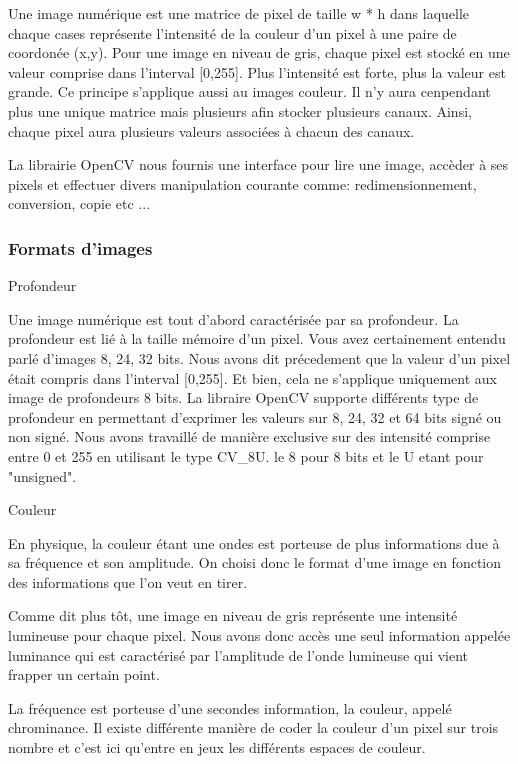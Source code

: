 \documentclass[11pt,a4paper,oldfontcommands]{memoir}
\begin{document}
Une image numérique est une matrice de pixel de taille w * h dans laquelle chaque cases représente l'intensité de la couleur d'un pixel à une paire de coordonée (x,y). Pour une image en niveau de gris, chaque pixel est stocké en une valeur comprise dans l'interval [0,255]. Plus l'intensité est forte, plus la valeur est grande. Ce principe s'applique aussi au images couleur. Il n'y aura cenpendant plus une unique matrice mais plusieurs afin stocker plusieurs canaux. Ainsi, chaque pixel aura plusieurs valeurs associées à chacun des canaux.

La librairie OpenCV nous fournis une interface pour lire une image, accèder à ses pixels et effectuer divers manipulation courante comme: redimensionnement, conversion, copie etc ...


\subsubsection{Formats d'images}

Profondeur

Une image numérique est tout d'abord caractérisée par sa profondeur. La profondeur est lié à la taille mémoire d'un pixel. Vous avez certainement entendu parlé d'images 8, 24, 32 bits. Nous avons dit précedement que la valeur d'un pixel était compris dans l'interval [0,255]. Et bien, cela ne s'applique uniquement aux image de profondeurs 8 bits. La libraire OpenCV supporte différents type de profondeur en permettant d'exprimer les valeurs sur 8, 24, 32 et 64 bits signé ou non signé. Nous avons travaillé de manière exclusive sur des intensité comprise entre 0 et 255 en utilisant le type CV\_8U. le 8 pour 8 bits et le U etant pour "unsigned".

Couleur

En physique, la couleur étant une ondes est porteuse de plus informations due à sa fréquence et son amplitude. On choisi donc le format d'une image en fonction des informations que l'on veut en tirer.

Comme dit plus tôt, une image en niveau de gris représente une intensité lumineuse pour chaque pixel. Nous avons donc accès une seul information appelée luminance qui est caractérisé par l'amplitude de l'onde lumineuse qui vient frapper un certain point.

La fréquence est porteuse d'une secondes information, la couleur, appelé chrominance. Il existe différente manière de coder la couleur d'un pixel sur trois nombre et c'est ici qu'entre en jeux les différents espaces de couleur.
\end{document}
